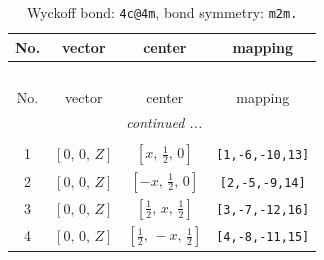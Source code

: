 \documentclass[fleqn,8pt]{jsarticle}
\begin{document}
\renewcommand{\arraystretch}{1.2}
\begin{longtable}{cccc}
\caption{Wyckoff bond: {\tt 4c@4m}, bond symmetry: {\tt m2m.}}
 \\
 \hline \hline
No. & vector & center & mapping \\ \hline \endfirsthead

\multicolumn{3}{l}{\tablename\ \thetable{}} \\
 \hline \hline
No. & vector & center & mapping \\ \hline \endhead

 \hline \hline
\multicolumn{3}{r}{\footnotesize\it continued ...} \\ \endfoot

 \hline \hline
\multicolumn{3}{r}{} \\ \endlastfoot

1 & $\left[ 0,\, 0,\, Z \right]$ & $\left[ x,\, \frac{1}{2},\, 0 \right]$ & {\tt [1,-6,-10,13]} \\ \hline
2 & $\left[ 0,\, 0,\, Z \right]$ & $\left[ - x,\, \frac{1}{2},\, 0 \right]$ & {\tt [2,-5,-9,14]} \\ \hline
3 & $\left[ 0,\, 0,\, Z \right]$ & $\left[ \frac{1}{2},\, x,\, \frac{1}{2} \right]$ & {\tt [3,-7,-12,16]} \\ \hline
4 & $\left[ 0,\, 0,\, Z \right]$ & $\left[ \frac{1}{2},\, - x,\, \frac{1}{2} \right]$ & {\tt [4,-8,-11,15]} \\
\end{longtable}
\renewcommand{\arraystretch}{1.2}
\end{document}
